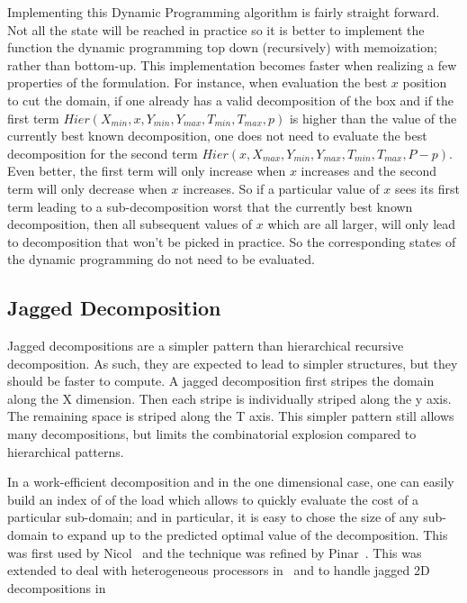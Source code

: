 \documentclass[10pt, conference, compsocconf]{IEEEtran}
\begin{document}
Implementing this Dynamic Programming algorithm is fairly straight
forward. Not all the state will be reached in practice so it is better
to implement the function the dynamic programming top down
(recursively) with memoization; rather than bottom-up. This
implementation becomes faster when realizing a few properties of the
formulation. For instance, when evaluation the best $x$ position to
cut the domain, if one already has a valid decomposition of the box
and if the first term $Hier(X_{min}, x, Y_{min}, Y_{max}, T_{min},
T_{max}, p)$ is higher than the value of the currently best known
decomposition, one does not need to evaluate the best decomposition
for the second term $Hier(x, X_{max}, Y_{min}, Y_{max}, T_{min},
T_{max}, P-p)$.  Even better, the first term will only increase when
$x$ increases and the second term will only decrease when $x$
increases. So if a particular value of $x$ sees its first term leading
to a sub-decomposition worst that the currently best known
decomposition, then all subsequent values of $x$ which are all larger,
will only lead to decomposition that won't be picked in practice. So
the corresponding states of the dynamic programming do not need to be evaluated.

\subsection{Jagged Decomposition}

Jagged decompositions are a simpler pattern than hierarchical
recursive decomposition. As such, they are expected to lead to simpler
structures, but they should be faster to compute. A jagged
decomposition first stripes the domain along the X dimension. Then
each stripe is individually striped along the y axis. The remaining
space is striped along the T axis. This simpler pattern still allows
many decompositions, but limits the combinatorial explosion compared
to hierarchical patterns.

In a work-efficient decomposition and in the one dimensional case, one
can easily build an index of of the load which allows to quickly
evaluate the cost of a particular sub-domain; and in particular, it is
easy to chose the size of any sub-domain to expand up to the predicted
optimal value of the decomposition. This was first used by
Nicol~\cite{Nicol94} and the technique was refined by
Pinar~\cite{pinar04}. This was extended to deal with heterogeneous processors
in~\cite{pinar08} and to handle jagged 2D decompositions in~\cite{saule12-jpdc-spart}
\end{document}
